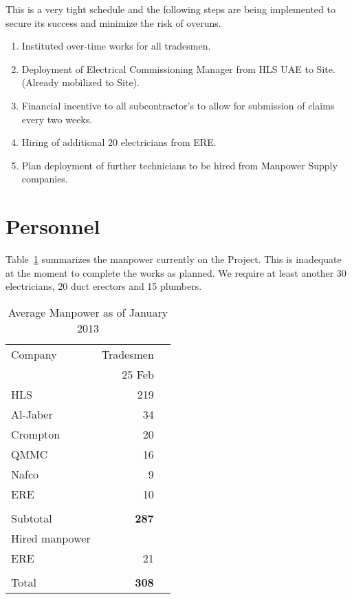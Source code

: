 This is a very tight schedule and the following steps are being implemented to secure its success and minimize the risk of overuns.

\begin{enumerate}
\item  Instituted over-time works for all tradesmen.
\item  Deployment of Electrical Commissioning Manager from HLS UAE to Site. (Already mobilized to Site).
\item  Financial incentive to all subcontractor's to allow for submission of claims every two weeks.
\item Hiring of additional 20 electricians from ERE.
\item Plan deployment of further technicians to be hired from Manpower Supply companies.
\end{enumerate}


\section*{Personnel}


 Table~\ref{personnel} summarizes the manpower currently on the Project. This is inadequate at the moment to complete the works as planned. We require at least another 30 electricians, 20 duct erectors and 15 plumbers.

\def\Z{\phantom{Z}}
\begin{table}[htbp]
\begin{center}
\begin{tabular}{l r r}
\toprule
Company           &Tradesmen  \\
~                 &25 Feb \\
\midrule
HLS                &219         \\
Al-Jaber          &34         \\
Crompton        &20           \\
QMMC            &16        \\
Nafco             &9           \\
ERE                &10          \\
                 
                  &\underline{\phantom{1075}}\\
Subtotal          &\textbf{287}        \\

Hired manpower    &         \\
\Z ERE            &21        \\
          
                 
&&\\
Total                      &\textbf{308}       \\
                           
\bottomrule
\end{tabular}
\caption{Average Manpower as of January 2013}
\label{personnel}
\end{center}
\end{table}



